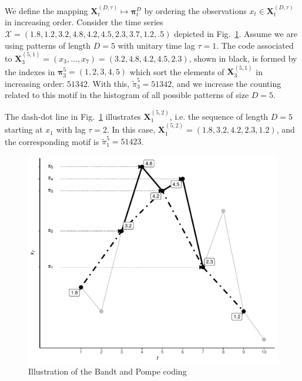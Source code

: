 \documentclass[journal]{IEEEtran}
\begin{document}
We define the mapping ${\mathbf X}_t^{(D,\tau)} \mapsto {\mathbf \pi}_t^{D}$ by ordering the observations $x_t \in {\mathbf X}_t^{(D,\tau)}$ in increasing order.
Consider the time series $\mathcal X = (1.8, 1.2, 3.2, 4.8, 4.2, 4.5, 2.3, 3.7, 1.2, .5)$ depicted in Fig.~\ref{Fig:IntroBP}.
Assume we are using patterns of length $D=5$ with unitary time lag $\tau=1$.
The code associated to $\mathbf X_{3}^{(5,1)}=(x_3,\dots,x_7)=(3.2, 4.8, 4.2, 4.5, 2.3)$, shown in black, is formed by the indexes in $\bm\pi_3^{5}=(1,2,3,4,5)$ which sort the elements of $\mathbf X_{3}^{(5,1)}$ in increasing order: $51342$.
With this, $\widetilde{\pi}_3^{5} = 51342$, and we increase the counting related to this motif in the histogram of all possible patterns of size $D=5$.

The dash-dot line in Fig.~\ref{Fig:IntroBP} illustrates $\mathbf X_{1}^{(5,2)}$, i.e. the sequence of length $D=5$ starting at $x_1$ with lag $\tau=2$.
In this case, $\mathbf X_{1}^{(5,2)}= (1.8, 3.2, 4.2, 2.3, 1.2)$, and the corresponding motif is $\widetilde{\pi}_1^{5}=51423$.

\begin{figure}[hbt]
	\centering
	\includegraphics[width=.9\linewidth]{Figures/IntroBP.pdf}
	\caption{Illustration of the Bandt and Pompe coding\label{Fig:IntroBP}}
\end{figure}
\end{document}
